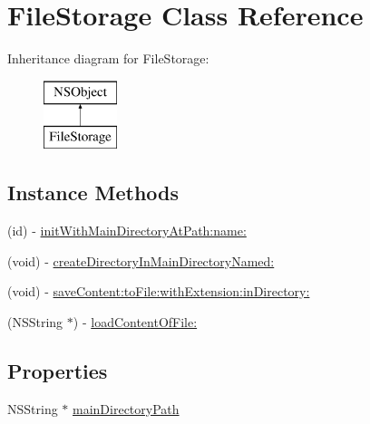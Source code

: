 \hypertarget{interface_file_storage}{\section{File\-Storage Class Reference}
\label{interface_file_storage}
}
Inheritance diagram for File\-Storage\-:\begin{figure}[H]
\begin{center}
\leavevmode
\includegraphics[height=2.000000cm]{interface_file_storage}
\end{center}
\end{figure}
\subsection*{Instance Methods}
\begin{DoxyCompactItemize}
\item 
(id) -\/ \hyperlink{interface_file_storage_abea8e334b69a46e9ef5182640ac554cc}{init\-With\-Main\-Directory\-At\-Path\-:name\-:}
\item 
(void) -\/ \hyperlink{interface_file_storage_ac26efdc1f4abc5e113acb36ef9203c1f}{create\-Directory\-In\-Main\-Directory\-Named\-:}
\item 
(void) -\/ \hyperlink{interface_file_storage_a6f57f600e9b7d583a882215c2b6b99ef}{save\-Content\-:to\-File\-:with\-Extension\-:in\-Directory\-:}
\item 
(N\-S\-String $\ast$) -\/ \hyperlink{interface_file_storage_aed3f1ddb7ebd4bb51cd52cd14a0b8c33}{load\-Content\-Of\-File\-:}
\end{DoxyCompactItemize}
\subsection*{Properties}
\begin{DoxyCompactItemize}
\item 
N\-S\-String $\ast$ \hyperlink{interface_file_storage_a0f4a35aa74fb49aaa7a9b897ceed902d}{main\-Directory\-Path}
\end{DoxyCompactItemize}


